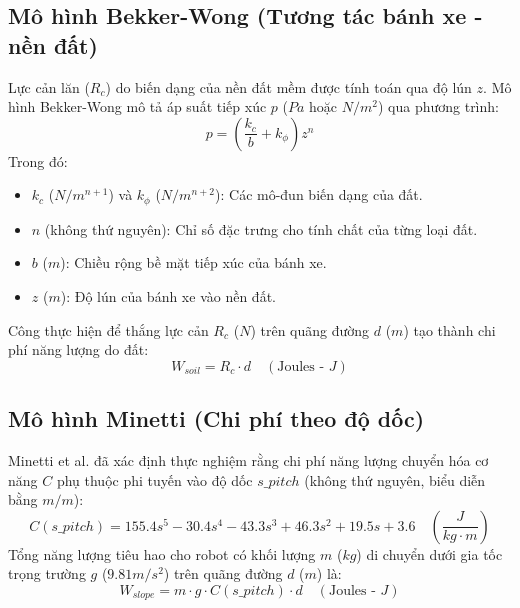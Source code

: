 \documentclass[12pt, a4paper]{article}
\begin{document}
\subsection{Mô hình Bekker-Wong (Tương tác bánh xe - nền đất)}
Lực cản lăn ($R_c$) do biến dạng của nền đất mềm được tính toán qua độ lún $z$. Mô hình Bekker-Wong \cite{bekker1956} mô tả áp suất tiếp xúc $p$ ($Pa$ hoặc $N/m^2$) qua phương trình:
\begin{equation}
    p = \left( \frac{k_c}{b} + k_{\phi} \right) z^n
\end{equation}
Trong đó:
\begin{itemize}
    \item $k_c$ ($N/m^{n+1}$) và $k_{\phi}$ ($N/m^{n+2}$): Các mô-đun biến dạng của đất.
    \item $n$ (không thứ nguyên): Chỉ số đặc trưng cho tính chất của từng loại đất.
    \item $b$ ($m$): Chiều rộng bề mặt tiếp xúc của bánh xe.
    \item $z$ ($m$): Độ lún của bánh xe vào nền đất.
\end{itemize}
Công thực hiện để thắng lực cản $R_c$ ($N$) trên quãng đường $d$ ($m$) tạo thành chi phí năng lượng do đất:
\begin{equation}
    W_{soil} = R_c \cdot d \quad (\text{Joules - } J)
\end{equation}

\subsection{Mô hình Minetti (Chi phí theo độ dốc)}
Minetti et al. \cite{minetti2002, minetti1993} đã xác định thực nghiệm rằng chi phí năng lượng chuyển hóa cơ năng $C$ phụ thuộc phi tuyến vào độ dốc $s\_pitch$ (không thứ nguyên, biểu diễn bằng $m/m$):
\begin{equation}
    C(s\_pitch) = 155.4 s^5 - 30.4 s^4 - 43.3 s^3 + 46.3 s^2 + 19.5 s + 3.6 \quad \left(\frac{J}{kg \cdot m}\right)
\end{equation}
Tổng năng lượng tiêu hao cho robot có khối lượng $m$ ($kg$) di chuyển dưới gia tốc trọng trường $g$ ($9.81 m/s^2$) trên quãng đường $d$ ($m$) là:
\begin{equation}
    W_{slope} = m \cdot g \cdot C(s\_pitch) \cdot d \quad (\text{Joules - } J)
\end{equation}
\end{document}
